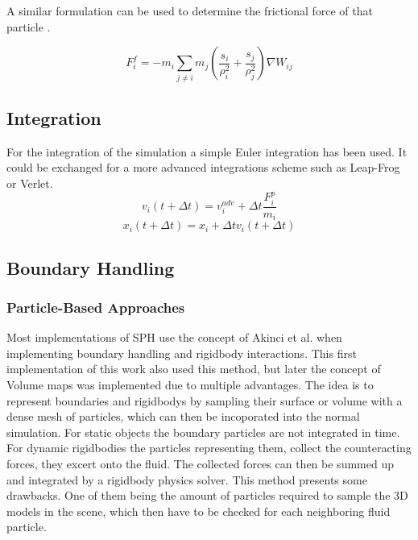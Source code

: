 \documentclass[intern]{cgMA}
\begin{document}
    A similar formulation can be used to determine the frictional force of that particle \cite{10.2312:PE:vriphys:vriphys12:053-060}.

    \begin{equation}
        F_i^f = -m_i \sum_{j \neq i} m_j (\frac{s_i}{\rho_i^2} + \frac{s_j}{\rho_j^2})  \nabla W_{ij}
    \end{equation}

    

    \subsection{Integration}
    For the integration of the simulation a simple Euler integration has been used. It could be exchanged for a more advanced integrations scheme such as Leap-Frog or Verlet.
    \begin{equation}
        v_i(t + \Delta t) = v_i^{adv} + \Delta t \frac{F_i^p}{m_i}
    \end{equation}
    \begin{equation}
        x_i(t + \Delta t) = x_i + \Delta t v_i(t + \Delta t)
    \end{equation}

    \subsection{Boundary Handling}
    
    \subsubsection*{Particle-Based Approaches}
    Most implementations of SPH use the concept of Akinci et al. \cite{boundary_handling} when implementing boundary handling and rigidbody interactions. This first implementation of this work also used this method, but later the concept of Volume maps was implemented due to multiple advantages. The idea is to represent boundaries and rigidbodys by sampling their surface or volume with a dense mesh of particles, which can then be incoporated into the normal simulation. For static objects the boundary particles are not integrated in time. For dynamic rigidbodies the particles representing them, collect the counteracting forces, they excert onto the fluid. The collected forces can then be summed up and integrated by a rigidbody physics solver.
    This method presents some drawbacks. One of them being the amount of particles required to sample the 3D models in the scene, which then have to be checked for each neighboring fluid particle. \cite{10.1145/3359566.3360077} \cite{10.2312:PE:vriphys:vriphys12:053-060} \cite{boundary_handling} \cite{10.1145/2185520.2185558}
\end{document}
